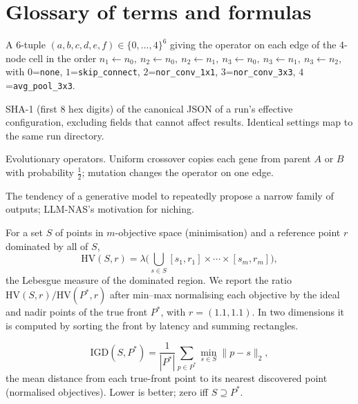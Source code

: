 \documentclass[preprint,12pt]{elsarticle}
\newcommand{\code}[1]{\texttt{#1}}
\newcommand{\HV}{\mathrm{HV}}
\newcommand{\IGD}{\mathrm{IGD}}
\begin{document}
\section{Glossary of terms and formulas}\label{sec:glossary}
\begin{description}[style=nextline,leftmargin=0pt,itemsep=3pt]

\item[Architecture code (NB201).] A 6-tuple $(a,b,c,d,e,f)\in\{0,\dots,4\}^6$ giving the operator on each edge of the 4-node cell in the order $n_1{\leftarrow}n_0,\ n_2{\leftarrow}n_0,\ n_2{\leftarrow}n_1,\ n_3{\leftarrow}n_0,\ n_3{\leftarrow}n_1,\ n_3{\leftarrow}n_2$, with $0$=\code{none}, $1$=\code{skip\_connect}, $2$=\code{nor\_conv\_1x1}, $3$=\code{nor\_conv\_3x3}, $4$=\code{avg\_pool\_3x3}.

\item[Configuration hash.] SHA-1 (first 8 hex digits) of the canonical JSON of a run's effective configuration, excluding fields that cannot affect results. Identical settings map to the same run directory.

\item[Crossover / mutation.] Evolutionary operators. Uniform crossover copies each gene from parent $A$ or $B$ with probability $\tfrac12$; mutation changes the operator on one edge.

\item[Exploration bias / mode collapse.] The tendency of a generative model to repeatedly propose a narrow family of outputs; LLM-NAS's motivation for niching.

\item[Hypervolume (HV).] For a set $S$ of points in $m$-objective space (minimisation) and a reference point $r$ dominated by all of $S$,
\[
\HV(S,r)=\lambda\Big(\bigcup_{s\in S}[s_1,r_1]\times\cdots\times[s_m,r_m]\Big),
\]
the Lebesgue measure of the dominated region. We report the ratio $\HV(S,r)/\HV(P^\ast,r)$ after min--max normalising each objective by the ideal and nadir points of the true front $P^\ast$, with $r=(1.1,1.1)$. In two dimensions it is computed by sorting the front by latency and summing rectangles.

\item[Inverted generational distance (IGD).]
\[
\IGD(S,P^\ast)=\frac{1}{|P^\ast|}\sum_{p\in P^\ast}\min_{s\in S}\lVert p-s\rVert_2,
\]
the mean distance from each true-front point to its nearest discovered point (normalised objectives). Lower is better; zero iff $S\supseteq P^\ast$.


\end{description}
\end{document}

